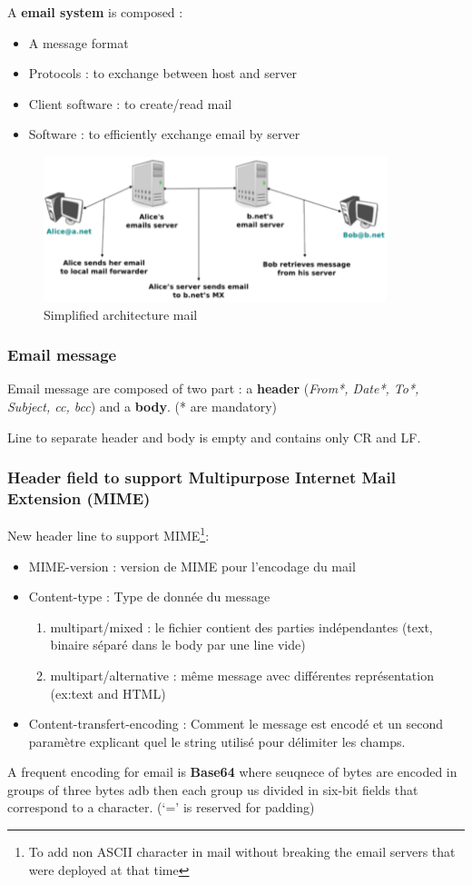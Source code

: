 A \textbf{email system} is composed :
\begin{itemize}
    \item A message format
    \item Protocols : to exchange between host and server
    \item Client software : to create/read mail
    \item Software : to efficiently exchange email by server
\end{itemize}
 
\begin{figure}[h]
    \centering
    \includegraphics[width=10cm]{mail.png}
    \caption{Simplified architecture mail}
\end{figure}

\subsubsection{Email message}
Email message are composed of two part : a \textbf{header} (\textit{From*, Date*, To*, Subject,  cc, bcc}) and a \textbf{body}. (* are mandatory)

Line to separate header and body is empty and contains only CR and LF.

\subsubsection{Header field to support Multipurpose Internet Mail Extension (MIME)}
New header line to support MIME\footnote{To add non ASCII character in mail without
breaking the email servers that were deployed at that time}:
\begin{itemize}
    \item MIME-version : version de MIME pour l'encodage du mail
    \item Content-type : Type de donnée du message
        \begin{enumerate}
            \item multipart/mixed : le fichier contient des parties indépendantes (text, binaire séparé dans le body par une line vide)
            \item multipart/alternative : même message avec différentes représentation (ex:text and HTML)
        \end{enumerate}
    \item Content-transfert-encoding : Comment le message est encodé et un second paramètre explicant quel le string utilisé pour délimiter les champs.
\end{itemize}
 A frequent encoding for email is \textbf{Base64} where seuqnece of bytes are encoded in groups of three bytes adb then each group us divided in six-bit fields that correspond to a character. (`=' is reserved for padding)


